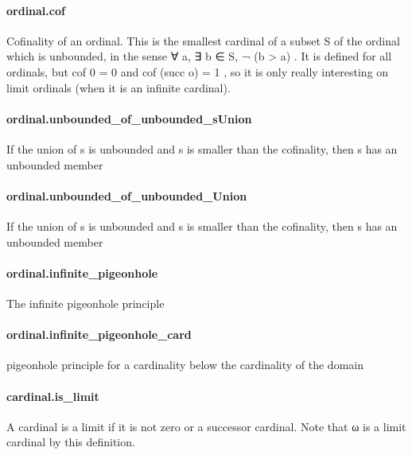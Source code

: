 \documentclass{article}
\begin{document}
\paragraph{ordinal.cof}
\par
Cofinality of an ordinal. This is the smallest cardinal of a
subset 
\colorbox[RGB]{253,246,227}{{{{\color[RGB]{101, 123, 131} S }}}} of the ordinal which is unbounded, in the sense
\colorbox[RGB]{253,246,227}{{{{\color[RGB]{101, 123, 131} ∀ a, ∃ b ∈ S,  }}}{{{\color[RGB]{181, 137, 0} ¬ }}}{{{\color[RGB]{101, 123, 131} (b  }}}{{{\color[RGB]{181, 137, 0} > }}}{{{\color[RGB]{101, 123, 131}  a) }}}}. It is defined for all ordinals, but
\colorbox[RGB]{253,246,227}{{{{\color[RGB]{101, 123, 131} cof  }}}{{{\color[RGB]{108, 113, 196} 0 }}}{{{\color[RGB]{101, 123, 131}   }}}{{{\color[RGB]{181, 137, 0} = }}}{{{\color[RGB]{101, 123, 131}   }}}{{{\color[RGB]{108, 113, 196} 0 }}}} and 
\colorbox[RGB]{253,246,227}{{{{\color[RGB]{101, 123, 131} cof (succ o)  }}}{{{\color[RGB]{181, 137, 0} = }}}{{{\color[RGB]{101, 123, 131}   }}}{{{\color[RGB]{108, 113, 196} 1 }}}}, so it is only really
interesting on limit ordinals (when it is an infinite cardinal).
\paragraph{ordinal.unbounded\_of\_unbounded\_sUnion}
\par
If the union of s is unbounded and s is smaller than the cofinality, then s has an unbounded member
\paragraph{ordinal.unbounded\_of\_unbounded\_Union}
\par
If the union of s is unbounded and s is smaller than the cofinality, then s has an unbounded member
\paragraph{ordinal.infinite\_pigeonhole}
\par
The infinite pigeonhole principle
\paragraph{ordinal.infinite\_pigeonhole\_card}
\par
pigeonhole principle for a cardinality below the cardinality of the domain
\paragraph{cardinal.is\_limit}
\par
A cardinal is a limit if it is not zero or a successor
cardinal. Note that 
\colorbox[RGB]{253,246,227}{{{{\color[RGB]{101, 123, 131} ω }}}} is a limit cardinal by this definition.
\end{document}
